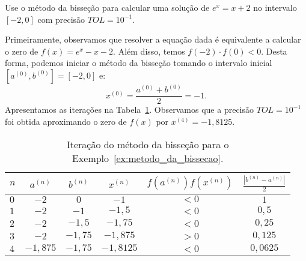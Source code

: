\begin{ex}\label{ex:metodo_da_bissecao}Use o método da bisseção para calcular uma solução de $e^x = x + 2$ no intervalo $[-2, 0]$ com precisão $TOL = 10^{-1}$.
\end{ex}
\begin{sol}
  Primeiramente, observamos que resolver a equação dada é equivalente a calcular o zero de $f(x) = e^x - x - 2$. Além disso, temos $f(-2)\cdot f(0) < 0$. Desta forma, podemos iniciar o método da bisseção tomando o intervalo inicial $[a^{(0)}, b^{(0)}] = [-2, 0]$ e:
  \begin{equation}
    x^{(0)} = \frac{a^{(0)} + b^{(0)}}{2} = -1.
  \end{equation}
  Apresentamos as iterações na Tabela~\ref{tab:metodo_da_bissecao}. Observamos que a precisão $TOL = 10^{-1}$ foi obtida aproximando o zero de $f(x)$ por $x^{(4)} = -1,8125$.
  \begin{table}
    \centering
    \caption{Iteração do método da bisseção para o Exemplo~\ref{ex:metodo_da_bissecao}.}
    \label{tab:metodo_da_bissecao}
    \begin{tabular}{l|ccc|c|c}\hline
      $n$ & $a^{(n)}$ & $b^{(n)}$ & $x^{(n)}$ & $f(a^{(n)})f(x^{(n)})$ & $\displaystyle \frac{|b^{(n)}-a^{(n)}|}{2}$\\\hline
      $0$ & $-2$ & $0$ & $-1$ & $< 0$ & $1$\\
      $1$ & $-2$ & $-1$ & $-1,5$ & $<0$ & $0,5$\\
      $2$ & $-2$ & $-1,5$ & $-1,75$ & $<0$ & $0,25$\\
      $3$ & $-2$ & $-1,75$ & $-1,875$ & $>0$ & $0,125$\\
      $4$ & $-1,875$ & $-1,75$ & $-1,8125$ & $<0$ & $0,0625$\\\hline
    \end{tabular}
  \end{table}


\end{sol}
